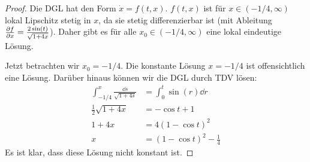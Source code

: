 \begin{proof}
	Die DGL hat den Form $\dot{x}=f(t, x)$. $f(t,x)$ ist f\"{u}r $x\in (-1/4, \infty)$ lokal Lipschitz stetig in $x$, da sie stetig differenzierbar ist (mit Ableitung $\pdv{f}{x}=\frac{2\sin(t)}{\sqrt{1+4x}}$). Daher gibt es f\"{u}r alle $x_0\in (-1/4,\infty)$ eine lokal eindeutige L\"{o}sung.
	
	Jetzt betrachten wir $x_0=-1/4$. Die konstante L\"{o}sung $x=-1/4$ ist offensichtlich eine L\"{o}sung. Darüber hinaus können wir die DGL durch TDV l\"{o}sen:
	\begin{align*}
	\int_{-1/4}^x \frac{\dd{s}}{\sqrt{1+4s}}&=\int_0^t \sin(r)\dd{r}\\
	\frac{1}{2}\sqrt{1+4x}&=-\cos t + 1\\
	1+4x&=4(1-\cos t)^2\\
	x &= (1-\cos t)^2 -\frac 14
\end{align*}
Es ist klar, dass diese L\"{o}sung nicht konstant ist.
\end{proof}

